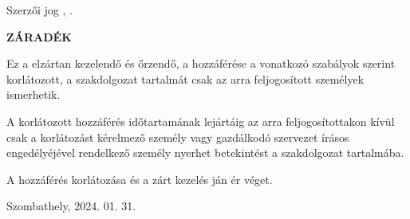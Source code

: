 \selecthungarian
\begin{flushleft}
Szerzői jog {\textcopyright} \authorName, \the\year.
\end{flushleft}

\vspace{0.5cm}

\begin{center}
\textbf{ZÁRADÉK}\\
\end{center}

\vspace{0.5cm}
\noindent
Ez a \MakeLowercase{\munkatipusHU} elzártan kezelendő és őrzendő, a hozzáférése a vonatkozó szabályok szerint korlátozott, a szakdolgozat tartalmát csak az arra feljogosított személyek ismerhetik.

A korlátozott hozzáférés időtartamának lejártáig az arra feljogosítottakon kívül csak a korlátozást kérelmező személy vagy gazdálkodó szervezet írásos engedélyéjével rendelkező személy nyerhet betekintést a szakdolgozat tartalmába.

\vspace{0.3cm}

A hozzáférés korlátozása és a zárt kezelés \endOfRestrictedAccess ján ér véget.

\vspace{30pt}
\noindent Szombathely, 2024. 01. 31.
\vfill
\clearpage
\thispagestyle{empty} %

\selectthesislanguage

